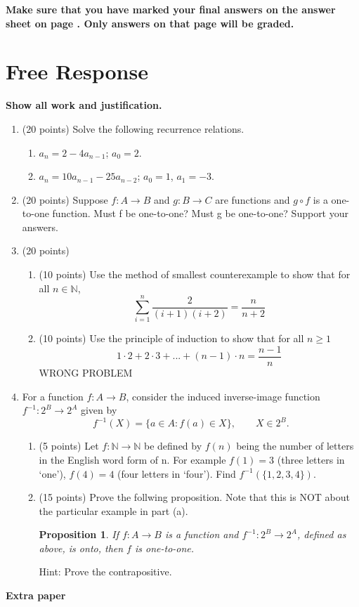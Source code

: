 \documentclass[12pt]{article}
\newtheorem*{proposition}{Proposition}
\begin{document}
\begin{center}
\textbf{Make sure that you have marked your final answers on the answer sheet on page \pageref{answersheet}. Only answers on that page will be graded.}
\end{center}
\newpage
\section*{Free Response}

\textbf{Show all work and justification.} 

\begin{enumerate}
\item (20 points) Solve the following recurrence relations.
\begin{enumerate}
\item $a_n=2-4a_{n-1}$; $a_0=2$.
\item $a_n=10a_{n-1}-25a_{n-2}$; $a_0=1$, $a_1=-3$.
\end{enumerate}
\newpage
\item (20 points) Suppose $f : A\to B$ and $g : B\to C$ are functions and $g\circ f$  is a one-to-one function.
Must f be one-to-one? Must g be one-to-one? Support your answers.
\newpage
\item (20 points)
\begin{enumerate}
\item (10 points) Use the method of smallest counterexample to show that for all $n\in\mathbb{N}$,
\[
\sum_{i=1}^n\frac{2}{(i+1)(i+2)}=\frac{n}{n+2}
\]
\item (10 points) Use the principle of induction to show that for all $n\geq 1$
\[
 1 \cdot 2 + 2 \cdot 3 + . . . + (n - 1) \cdot n =\frac{n-1}{n}
\]
WRONG PROBLEM
\end{enumerate}
\newpage
\item For a function $f : A\to B$, consider the induced inverse-image function $f^{-1}:2^B\to 2^A$ given by 
\[
f^{-1}(X)=\{a\in A: f(a)\in X\},\qquad X\in 2^B.
\]
\begin{enumerate}
\item (5 points) Let $f: \mathbb{N}\to \mathbb{N}$ be defined by $f(n)$ being the number of letters in the English word form of n. For example $f(1)=3$ (three letters in `one'), $f(4)=4$ (four letters in `four'). Find $f^{-1}(\{1,2,3,4\})$.

\item (15 points) Prove the follwing proposition. Note that this is NOT about the particular example in part (a).

\begin{proposition}
If $f:A\to B$ is a function and $f^{-1}:2^B\to 2^A$, defined as above, is onto, then $f$ is one-to-one. 
\end{proposition}
Hint: Prove the contrapositive.
\end{enumerate}

\end{enumerate}

\newpage
\noindent
\textbf{Extra paper}
%

%
\end{document}
